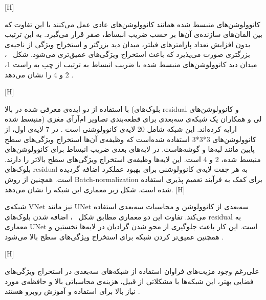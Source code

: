 [H]

کانوولوشن‌های منبسط شده همانند کانوولوشن‌های عادی عمل می‌کنند با این تفاوت که بین المان‌های سازنده‌ی آن‌ها بر حسب ضریب انبساط، صفر قرار می‌گیرد. به این ترتیب بدون افزایش تعداد پارامتر‌های فیلتر، میدان دید بزرگتر و استخراج ویژگی از ناحیه‌‌ی بزرگتری صورت می‌پذیرد که باعث استخراج ویژگی‌های عمیق‌تری می‌شود. شکل ~، میدان دید کانوولوشن‌های منبسط شده با ضریب انبساط به ترتیب از چپ به راست 1، 2 و 4 را نشان می‌دهد .

[H]

با استفاده از دو ایده‌ی معرفی شده در بالا (بلوک‌های residual و کانوولوشن‌های منبسط شده) لی و همکاران یک شبکه‌ی سه‌بعدی برای قطعه‌بندی تصاویر ام‌آرآی مغزی ارایه کرده‌اند. این شبکه شامل 20 لایه‌ی کانوولوشنی است . در 7 لایه‌ی اول، از کانوولوشن‌های 3*3*3 استفاده شده‌‌است که وظیفه‌ی آن‌ها استخراج ویژگی‌های سطح پایین مانند لبه‌ها و گوشه‌هاست. در لایه‌های بعدی ضریب انبساط برای کانوولوشن‌های منبسط شده، 2 و 4 است. این لایه‌ها وظیفه‌ی استخراج ویژگی‌های سطح بالاتر را دارند. بلوک‌های residual به هر جفت لایه‌ی کانوولوشنی برای بهبود عملکرد اضافه گردیده است. همچنین از روش Batch-normalization برای کمک به فرآیند تعمیم پذیری استفاده شده است. شکل زیر معماری این شبکه را نشان می‌دهد.
[H]

شبکه‌ی VNet نیز مانند UNet سه‌بعدی از کانوولوشن و محاسبات سه‌بعدی استفاده می‌کند. تفاوت این دو معماری مطابق شکل ~، اضافه شدن بلوک‌های residual به معماری UNet است. این کار باعث جلوگیری از محو شدن گرادیان در لایه‌ها نخستین و همچنین عمیق‌تر کردن شبکه برای استخراج ویژگی‌های سطح بالا می‌شود .

[H]

علی‌رغم وجود مزیت‌های فراوان استفاده از شبکه‌های سه‌بعدی در استخراج ویژگی‌های فضایی بهتر، این شبکه‌ها با مشکلاتی از قبیل، هزینه‌ی محاسباتی بالا و حافظه‌ی مورد نیاز بالا برای استفاده و آموزش روبرو هستند . 

 
